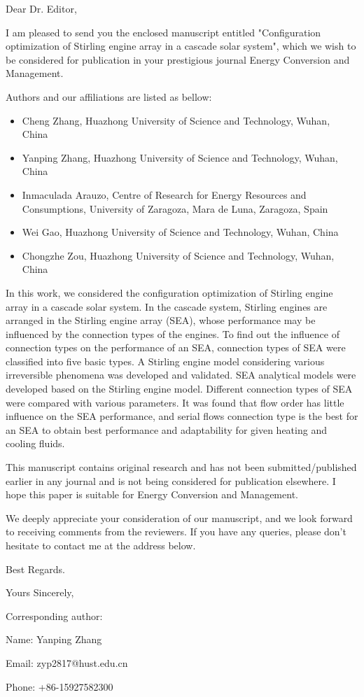 \documentclass[12pt]{letter}
\begin{document}
Dear Dr. Editor,

I am pleased to send you the enclosed manuscript entitled "Configuration optimization of Stirling engine array in a cascade solar system", which we wish to be considered for publication in your prestigious journal Energy Conversion and Management.

Authors and our affiliations are listed as bellow:

\begin{itemize}
  \item Cheng Zhang, Huazhong University of Science and Technology, Wuhan, China

  \item Yanping Zhang, Huazhong University of Science and Technology, Wuhan, China
  
  \item Inmaculada Arauzo, Centre of Research for Energy Resources and Consumptions, University of Zaragoza, Mara de Luna, Zaragoza, Spain
  
  \item Wei Gao, Huazhong University of Science and Technology, Wuhan, China
  
  \item Chongzhe Zou, Huazhong University of Science and Technology, Wuhan, China

\end{itemize}

In this work, we considered the configuration optimization of Stirling engine array in a cascade solar system. In the cascade system, Stirling engines are arranged in the Stirling engine array (SEA), whose performance may be influenced by the connection types of the engines. To find out the influence of connection types on the performance of an SEA, connection types of SEA were classified into five basic types. A Stirling engine model considering various irreversible phenomena was developed and validated. SEA analytical models were developed based on the Stirling engine model. Different connection types of SEA were compared with various parameters. It was found that flow order has little influence on the SEA performance, and serial flows connection type is the best for an SEA to obtain best performance and adaptability for given heating and cooling fluids.

This manuscript contains original research and has not been submitted/published earlier in any journal and is not being considered for publication elsewhere. I hope this paper is suitable for Energy Conversion and Management.

We deeply appreciate your consideration of our manuscript, and we look forward to receiving comments from the reviewers. If you have any queries, please don't hesitate to contact me at the address below.

Best Regards.

Yours Sincerely,

Corresponding author:

Name: Yanping Zhang

Email: zyp2817@hust.edu.cn

Phone: +86-15927582300
\end{document}
